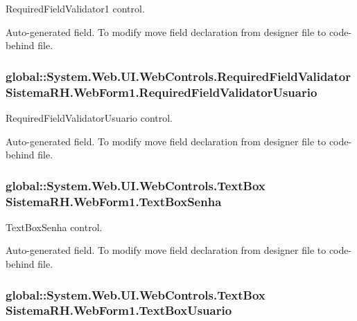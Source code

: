 RequiredFieldValidator1 control. 

Auto-\/generated field. To modify move field declaration from designer file to code-\/behind file. \hypertarget{class_sistema_r_h_1_1_web_form1_aefe621ace948bf25f184de6cf7c01363}{
\subsubsection[{RequiredFieldValidatorUsuario}]{\setlength{\rightskip}{0pt plus 5cm}global::System.Web.UI.WebControls.RequiredFieldValidator {\bf SistemaRH.WebForm1.RequiredFieldValidatorUsuario}}}
\label{class_sistema_r_h_1_1_web_form1_aefe621ace948bf25f184de6cf7c01363}


RequiredFieldValidatorUsuario control. 

Auto-\/generated field. To modify move field declaration from designer file to code-\/behind file. \hypertarget{class_sistema_r_h_1_1_web_form1_ae9a568e1d9fadb99f0488fa437fa75c3}{
\subsubsection[{TextBoxSenha}]{\setlength{\rightskip}{0pt plus 5cm}global::System.Web.UI.WebControls.TextBox {\bf SistemaRH.WebForm1.TextBoxSenha}}}
\label{class_sistema_r_h_1_1_web_form1_ae9a568e1d9fadb99f0488fa437fa75c3}


TextBoxSenha control. 

Auto-\/generated field. To modify move field declaration from designer file to code-\/behind file. \hypertarget{class_sistema_r_h_1_1_web_form1_a05fab8e61d8314061c68581aaa22ff27}{
\subsubsection[{TextBoxUsuario}]{\setlength{\rightskip}{0pt plus 5cm}global::System.Web.UI.WebControls.TextBox {\bf SistemaRH.WebForm1.TextBoxUsuario}}}
\label{class_sistema_r_h_1_1_web_form1_a05fab8e61d8314061c68581aaa22ff27}



